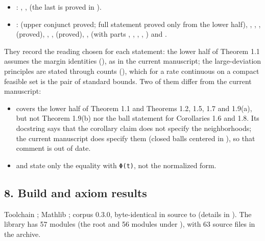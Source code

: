 \documentclass[english,11pt,a4paper]{article}
\providecommand{\tightlist}{\setlength{\itemsep}{0pt}\setlength{\parskip}{0pt}}
\begin{document}
\begin{itemize}
\tightlist
\item
  : , ,  (the last is proved in ).
\item
  :  (upper conjunct proved; full statement proved only from the lower half), , , ,  (proved), , ,  (proved), ,  (with parts , , , , ) and .
\end{itemize}

They record the reading chosen for each statement: the lower half of Theorem 1.1 assumes the margin identities (), as in the current manuscript; the large-deviation principles are stated through counts (), which for a rate continuous on a compact feasible set is the pair of standard bounds. Two of them differ from the current manuscript:

\begin{itemize}
\tightlist
\item
   covers the lower half of Theorem 1.1 and Theorems 1.2, 1.5, 1.7 and 1.9(a), but not Theorem 1.9(b) nor the ball statement for Corollaries 1.6 and 1.8. Its docstring says that the corollary claim does not specify the neighborhoods; the current manuscript does specify them (closed balls centered in ), so that comment is out of date.
\item
   and  state only the equality with \texttt{Φ(t)}, not the normalized form.
\end{itemize}

\subsection{8. Build and axiom results}\label{build-and-axiom-results}

Toolchain ; Mathlib ; corpus  0.3.0, byte-identical in source to  (details in ). The library  has 57 modules (the root  and 56 modules under ), with 63 source files in the archive.
\end{document}
